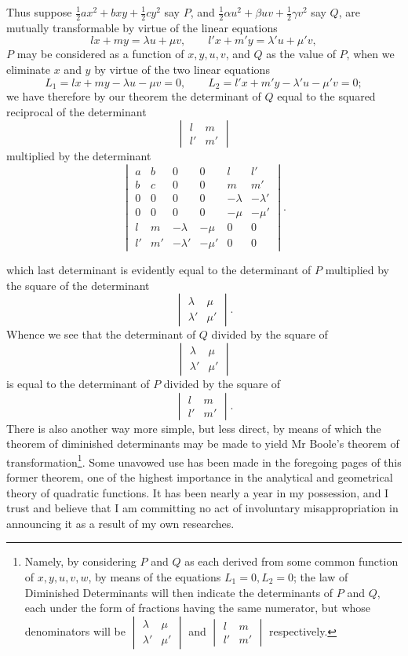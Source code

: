 \documentclass[11pt]{article}
\newcommand{\sourcepage}[1]{\marginpar{\scriptsize p.~#1}}
\begin{document}
Thus suppose $\frac12 ax^2+bxy+\frac12 cy^2$ say $P$, and $\frac12\alpha u^2+\beta uv+\frac12\gamma v^2$ say $Q$, are mutually transformable by virtue of the linear equations
\[
lx+my=\lambda u+\mu v,\qquad
l'x+m'y=\lambda'u+\mu'v,
\]
$P$ may be considered as a function of $x,y,u,v$, and $Q$ as the value of $P$, when we eliminate $x$ and $y$ by virtue of the two linear equations
\[
L_1=lx+my-\lambda u-\mu v=0,\qquad
L_2=l'x+m'y-\lambda'u-\mu'v=0;
\]
we have therefore by our theorem the determinant of $Q$ equal to the squared reciprocal of the determinant
\[
\begin{vmatrix}l&m\\ l'&m'\end{vmatrix}
\]
multiplied by the determinant
\[
\begin{vmatrix}
a&b&0&0&l&l'\\
b&c&0&0&m&m'\\
0&0&0&0&-\lambda&-\lambda'\\
0&0&0&0&-\mu&-\mu'\\
l&m&-\lambda&-\mu&0&0\\
l'&m'&-\lambda'&-\mu'&0&0
\end{vmatrix}.
\]

\sourcepage{137}
which last determinant is evidently equal to the determinant of $P$ multiplied by the square of the determinant
\[
\begin{vmatrix}\lambda&\mu\\ \lambda'&\mu'\end{vmatrix}.
\]
Whence we see that the determinant of $Q$ divided by the square of
\[
\begin{vmatrix}\lambda&\mu\\ \lambda'&\mu'\end{vmatrix}
\]
is equal to the determinant of $P$ divided by the square of
\[
\begin{vmatrix}l&m\\ l'&m'\end{vmatrix}.
\]
There is also another way more simple, but less direct, by means of which the theorem of diminished determinants may be made to yield Mr Boole's theorem of transformation\footnote{Namely, by considering $P$ and $Q$ as each derived from some common function of $x,y,u,v,w$, by means of the equations $L_1=0,L_2=0$; the law of Diminished Determinants will then indicate the determinants of $P$ and $Q$, each under the form of fractions having the same numerator, but whose denominators will be $\begin{vmatrix}\lambda&\mu\\ \lambda'&\mu'\end{vmatrix}$ and $\begin{vmatrix}l&m\\ l'&m'\end{vmatrix}$ respectively.}. Some unavowed use has been made in the foregoing pages of this former theorem, one of the highest importance in the analytical and geometrical theory of quadratic functions. It has been nearly a year in my possession, and I trust and believe that I am committing no act of involuntary misappropriation in announcing it as a result of my own researches.
\end{document}
